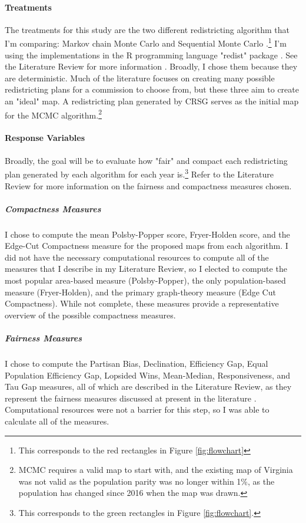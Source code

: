 \paragraph{Treatments}

The treatments for this study are the two different redistricting algorithm that I'm comparing: Markov chain Monte Carlo \parencite{fifield2020} and Sequential Monte Carlo \parencite{mccartan2020}.\footnote{This corresponds to the red rectangles in Figure \ref{fig:flowchart}} I'm using the implementations in the R programming language "redist" package \parencite{fifield2020d}. See the Literature Review for more information . Broadly, I chose them because they are deterministic. Much of the literature focuses on creating many possible redistricting plans for a commission to choose from, but these three aim to create an "ideal" map. A redistricting plan generated by CRSG serves as the initial map for the MCMC algorithm.\footnote{MCMC requires a valid map to start with, and the existing map of Virginia was not valid as the population parity was no longer within 1\%, as the population has changed since 2016 when the map was drawn.} 

\paragraph{Response Variables}

Broadly, the goal will be to evaluate how "fair" and compact each redistricting plan generated by each algorithm for each year is.\footnote{This corresponds to the green rectangles in Figure \ref{fig:flowchart}.} Refer to the Literature Review for more information on the fairness and compactness measures chosen.

\subparagraph{Compactness Measures}

I chose to compute the mean Polsby-Popper score, Fryer-Holden score, and the Edge-Cut Compactness measure for the proposed maps from each algorithm. I did not have the necessary computational resources to compute all of the measures that I describe in my Literature Review, so I elected to compute the most popular area-based measure (Polsby-Popper), the only population-based measure (Fryer-Holden), and the primary graph-theory measure (Edge Cut Compactness). While not complete, these measures provide a representative overview of the possible compactness measures. 

\subparagraph{Fairness Measures}

I chose to compute the Partisan Bias, Declination, Efficiency Gap, Equal Population Efficiency Gap, Lopsided Wins, Mean-Median, Responsiveness, and Tau Gap measures, all of which are described in the Literature Review, as they represent the fairness measures discussed at present in the literature \parencite{katz2020}. Computational resources were not a barrier for this step, so I was able to calculate all of the measures. 

